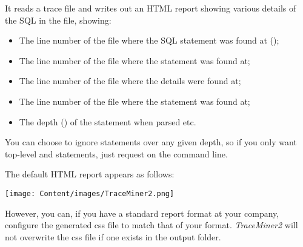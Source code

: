\begin{appendix}
It reads a trace file and writes out an HTML report showing various
details of the SQL in the file, showing:

\begin{itemize}
\tightlist
\item
  The line number of the file where the SQL statement was found at
  ();
\item
  The line number of the file where  the  statement was found at;
\item
  The line number of the file where  the  details were found at;
\item
  The line number of the file where  the  statement was found at;
\item
  The depth () of the statement when parsed etc.
\end{itemize}

You can choose to ignore statements over any given depth, so if you only
want top-level and  statements, just request  on the
command line. 

The default HTML report appears as follows:

\texttt{[image: Content/images/TraceMiner2.png]}

However, you can, if you have a standard report format at your company,
configure the generated css file to match that of your format.
\emph{TraceMiner2} will not overwrite the css file if one exists in the
output folder.

\end{appendix}
